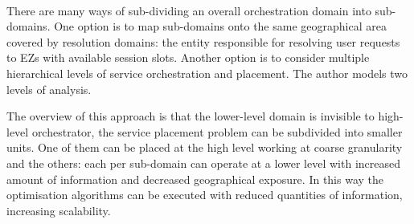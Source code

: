 \paragraph{}There are many ways of sub-dividing an overall orchestration domain into sub-domains. One option is to map sub-domains onto the same geographical area covered by resolution domains: the entity responsible for resolving user requests to EZs with available session slots. Another option is to consider multiple hierarchical levels of service orchestration and placement. The author models two levels of analysis.

The overview of this approach is that the lower-level domain is invisible to high-level orchestrator, the service placement problem can be subdivided into smaller units. One of them can be placed at the high level working at coarse granularity and the others: each per sub-domain can operate at a lower level with increased amount of information and decreased geographical exposure. In this way the optimisation algorithms can be executed with reduced quantities of information, increasing scalability. 
 
 
